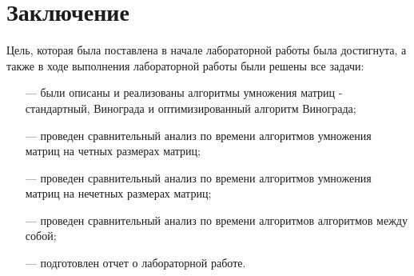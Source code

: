 \chapter*{Заключение}

Цель, которая была поставлена в начале лабораторной работы была достигнута, а также в ходе выполнения лабораторной работы были решены все задачи:

\begin{itemize}
	\item[---] были описаны и реализованы алгоритмы умножения матриц - стандартный, Винограда и оптимизированный алгоритм Винограда;
    \item[---] проведен сравнительный анализ по времени алгоритмов умножения матриц на четных размерах матриц;
	\item[---] проведен сравнительный анализ по времени алгоритмов умножения матриц на нечетных размерах матриц;
	\item[---] проведен сравнительный анализ по времени алгоритмов алгоритмов между собой;
	\item[---] подготовлен отчет о лабораторной работе.
\end{itemize}